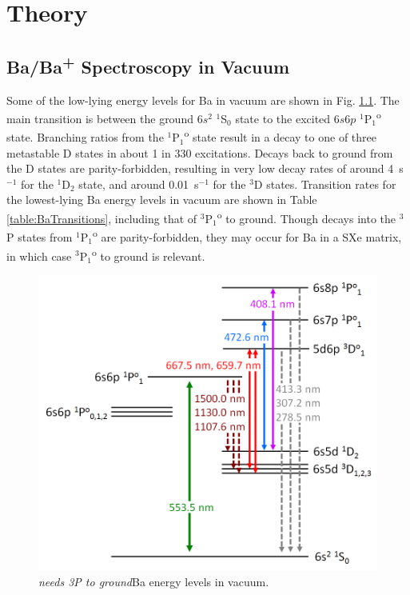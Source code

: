 \chapter{Theory}


\section{Ba/Ba\textsuperscript{+} Spectroscopy in Vacuum}
\label{sec:vacuum}

Some of the low-lying energy levels for Ba in vacuum are shown in Fig. \ref{fig:elevsBa}.  The main transition is between the ground $6s^{2}$ $^{1}$S$_{0}$ state to the excited $6s6p$ $^{1}$P$_{1}$\textsuperscript{o} state.  Branching ratios from the $^{1}$P$_{1}$\textsuperscript{o} state result in a decay to one of three metastable D states in about 1 in 330 excitations.  Decays back to ground from the D states are parity-forbidden, resulting in very low decay rates of around 4~s$^{-1}$ for the $^{1}$D$_{2}$ state, and around 0.01~s$^{-1}$ for the $^{3}$D states.  Transition rates for the lowest-lying Ba energy levels in vacuum are shown in Table \ref{table:BaTransitions}, including that of $^{3}$P$_{1}$\textsuperscript{o} to ground.  Though decays into the $^{3}$P states from $^{1}$P$_{1}$\textsuperscript{o} are parity-forbidden, they may occur for Ba in a SXe matrix, in which case $^{3}$P$_{1}$\textsuperscript{o} to ground is relevant.

\begin{figure} %
	\includegraphics[width=.8\textwidth]{figures/elevs_Ba_extra.png}
	\caption{\emph{\color{gray}needs 3P to ground}Ba energy levels in vacuum.}
    \label{fig:elevsBa}
\end{figure}

